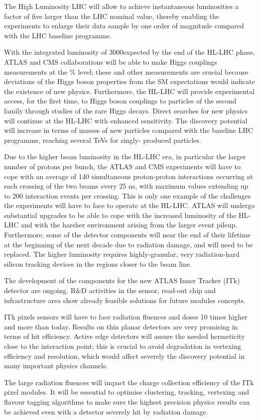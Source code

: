The High Luminosity LHC will allow to achieve instantaneous luminosities a factor of five larger than the 
LHC nominal value, thereby enabling the experiments to enlarge their data sample by one order of 
magnitude compared with the LHC baseline programme.

With the integrated luminosity of 3000\invfb expected by the end of the HL-LHC phase, ATLAS and CMS 
collaborations will be able to make Higgs couplings measurements at the \% level; 
these and other measurements are crucial because deviations of the Higgs boson properties from the SM 
expectations would indicate the existence of new physics. 
Furthermore, the HL-LHC will provide experimental access, for the first time, to Higgs boson couplings to particles of the second family through studies of the rare Higgs decays.
Direct searches for new physics will continue at 
the HL-LHC with enhanced sensitivity. The discovery potential will increase  in terms of 
masses of new particles compared with the baseline LHC programme, reaching several TeVs for singly-
produced particles.

Due to the higher beam luminosity in the HL-LHC era, in particular the larger number of protons per bunch, 
the ATLAS and CMS experiments will have to cope with an average of 140 simultaneous proton-proton 
interactions occurring at each crossing of the two beams every 25 ns, with maximum 
values extending up to 200 interaction events per crossing. This is only one example of the challenges the 
experiments will have to face to operate at the HL-LHC.
 ATLAS  will undergo substantial upgrades to be able to cope with the increased luminosity of the HL-LHC 
and with the harsher environment arising from the larger event pileup. Furthermore, some of the detector 
components will near the end of their lifetime at the beginning of the next decade due to radiation damage, 
and will need to be replaced. The higher luminosity  requires highly-granular, very radiation-hard silicon 
tracking devices in the regions closer to the beam line.


The development of the components for the new ATLAS Inner Tracker (ITk) detector are ongoing.
 R\&D activities in the sensor, read-out chip and infrastructure area show already feasible solutions for 
 future modules concepts.

ITk pixels sensors will have to face radiation fluences and doses 10 times higher and more than today. 
Results on thin planar detectors are very promising in terms of hit efficiency. Active edge detectors 
will assure the needed hermeticity close to the interaction point; this is crucial to avoid 
degradation in vertexing efficiency and resolution, which would affect severely the  
discovery potential in many important physics channels.

The large radiation fluences will impact the charge collection efficiency of the ITk pixel modules. 
It will be essential to optimise clustering, tracking, vertexing and flavour tagging algorithms to 
make sure the highest precision physics results can be achieved even with a detector severely hit 
by radiation damage. 

